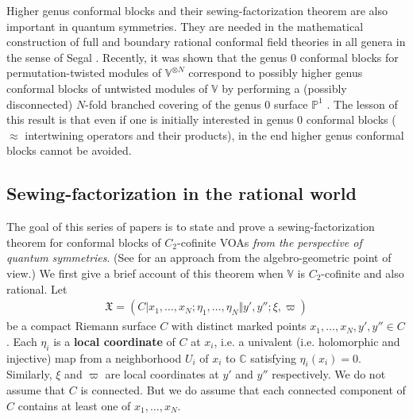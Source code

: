 \documentclass[11pt,b5paper,notitlepage]{article}
\theoremstyle{definition}
\theoremstyle{plain}
\newcommand{\Vbb}{\mathbb V}
\newcommand{\Cbb}{\mathbb C}
\newcommand{\Pbb}{\mathbb P}
\newcommand{\<}{\left\langle}
\renewcommand{\>}{\right\rangle}
\newcommand{\fx}{\mathfrak{X}}
\numberwithin{equation}{subsection}
\begin{document}
Higher genus conformal blocks and their sewing-factorization theorem are also important in quantum symmetries. They are needed in the mathematical construction of full and boundary rational conformal field theories in all genera in the sense of Segal \cite{Segal-CFT1,Segal-CFT2}. Recently, it was shown that the genus $0$ conformal blocks for permutation-twisted modules of $\Vbb^{\otimes N}$ correspond to possibly higher genus conformal blocks of untwisted modules of $\Vbb$ by performing a (possibly disconnected) $N$-fold branched covering of the genus $0$ surface $\Pbb^1$ \cite{Gui-permutation}. The lesson of this result is that even if one is initially interested in genus $0$ conformal blocks ($\approx$ intertwining operators and their products), in the end higher genus conformal blocks cannot be avoided.

\subsection{Sewing-factorization in the rational world}\label{lb84}


The goal of this series of papers is to state and prove a sewing-factorization theorem for conformal blocks of $C_2$-cofinite VOAs \emph{from the perspective of quantum symmetries}. (See \cite{DGK-presentations} for an approach from the algebro-geometric point of view.) We first give a brief account of this theorem when $\Vbb$ is $C_2$-cofinite and also rational. Let
\begin{align}
\fx=(C|x_1,\dots,x_N;\eta_1,\dots,\eta_N\Vert y',y'';\xi,\varpi)
\end{align}
be a compact Riemann surface $C$ with distinct marked points $x_1,\dots,x_N,y',y''\in C$. Each $\eta_i$ is a \textbf{local coordinate} of $C$ at $x_i$, i.e. a univalent (i.e. holomorphic and injective) map from a neighborhood $U_i$ of $x_i$ to $\Cbb$ satisfying $\eta_i(x_i)=0$. Similarly, $\xi$ and $\varpi$ are local coordinates at $y'$ and $y''$ respectively. We do not assume that $C$ is connected. But we do assume that each connected component of $C$ contains at least one of $x_1,\dots,x_N$. 
\end{document}
